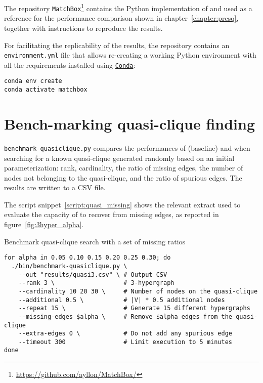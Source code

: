 The repository \texttt{MatchBox}\footnote{\url{https://github.com/ayllon/MatchBox/}}
contains the Python implementation of \PresQ and \Find used as a reference for the
performance comparison shown in chapter~\ref{chapter:presq}, together with instructions
to reproduce the results.

For facilitating the replicability of the results, the repository contains an \linebreak
\texttt{environment.yml} file that allows re-creating a working Python environment
with all the requirements installed using \href{https://docs.conda.io/en/latest/}{\texttt{Conda}}:

\begin{verbatim}
conda env create
conda activate matchbox
\end{verbatim}

\section{Bench-marking quasi-clique finding}

\texttt{benchmark-quasiclique.py} compares the performances of \Find (baseline) and \PresQ
when searching for a known quasi-clique generated randomly based on an initial parameterization:
rank, cardinality, the ratio of missing edges, the number of nodes not belonging to the
quasi-clique, and the ratio of spurious edges. The results are written to a \gls{CSV} file.

The script snippet~\ref{script:quasi_missing} shows the relevant extract used to evaluate
the capacity of \PresQ to recover from missing edges, as reported in figure~\ref{fig:3hyper_alpha}.

\begin{code}
\caption{Benchmark quasi-clique search with a set of missing ratios}\label{script:quasi_missing}
\begin{verbatim}
for alpha in 0.05 0.10 0.15 0.20 0.25 0.30; do
  ./bin/benchmark-quasiclique.py \
    --out "results/quasi3.csv" \ # Output CSV
    --rank 3 \                   # 3-hypergraph
    --cardinality 10 20 30 \     # Number of nodes on the quasi-clique
    --additional 0.5 \           # |V| * 0.5 additional nodes
    --repeat 15 \                # Generate 15 different hypergraphs
    --missing-edges $alpha \     # Remove $alpha edges from the quasi-clique
    --extra-edges 0 \            # Do not add any spurious edge
    --timeout 300                # Limit execution to 5 minutes
done
\end{verbatim}
\end{code}

